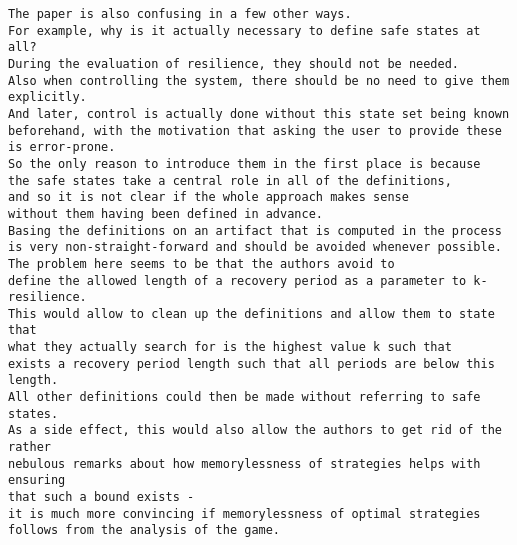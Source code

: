 \documentclass[times,10pt,twocolumn]{article}
\begin{document}
\begin{verbatim} 
The paper is also confusing in a few other ways. 
For example, why is it actually necessary to define safe states at all? 
During the evaluation of resilience, they should not be needed. 
Also when controlling the system, there should be no need to give them explicitly. 
And later, control is actually done without this state set being known 
beforehand, with the motivation that asking the user to provide these 
is error-prone. 
So the only reason to introduce them in the first place is because 
the safe states take a central role in all of the definitions, 
and so it is not clear if the whole approach makes sense 
without them having been defined in advance. 
Basing the definitions on an artifact that is computed in the process 
is very non-straight-forward and should be avoided whenever possible. 
The problem here seems to be that the authors avoid to 
define the allowed length of a recovery period as a parameter to k-resilience. 
This would allow to clean up the definitions and allow them to state that 
what they actually search for is the highest value k such that 
exists a recovery period length such that all periods are below this length. 
All other definitions could then be made without referring to safe states. 
As a side effect, this would also allow the authors to get rid of the rather 
nebulous remarks about how memorylessness of strategies helps with ensuring 
that such a bound exists - 
it is much more convincing if memorylessness of optimal strategies 
follows from the analysis of the game.
\end{verbatim} 
\end{document}

